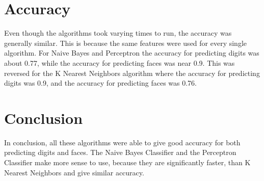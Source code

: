 \documentclass[12pt]{article}
\begin{document}
\section*{Accuracy}
Even though the algorithms took varying times to run, the accuracy was generally similar. This is because the same features were used for every single algorithm. For Naive Bayes and Perceptron the accuracy for predicting digits was about 0.77, while the accuracy for predicting faces was near 0.9. This was reversed for the K Nearest Neighbors algorithm where the accuracy for predicting digits was 0.9, and the accuracy for predicting faces was 0.76.\\

\section*{Conclusion}
In conclusion, all these algorithms were able to give good accuracy for both predicting digits and faces. The Naive Bayes Classifier and the Perceptron Classifier make more sense to use, because they are significantly faster, than K Nearest Neighbors and give similar accuracy. 
\end{document}
